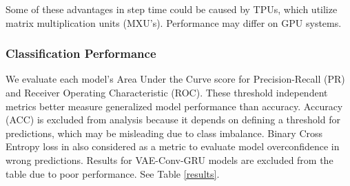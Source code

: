 \documentclass[letterpaper]{article} %
\begin{document}
Some of these advantages in step time could be caused by TPUs, which utilize matrix multiplication units (MXU's). Performance may differ on GPU systems.


\subsubsection{Classification Performance}

We evaluate each model's Area Under the Curve score for Precision-Recall (PR) and Receiver Operating Characteristic (ROC). These threshold independent metrics better measure generalized model performance than accuracy. Accuracy (ACC) is excluded from analysis because it depends on defining a threshold for predictions, which may be misleading due to class imbalance. Binary Cross Entropy loss in also considered as a metric to evaluate model overconfidence in wrong predictions. Results for VAE-Conv-GRU models are excluded from the table due to poor performance. See Table \ref{results}.
\end{document}
